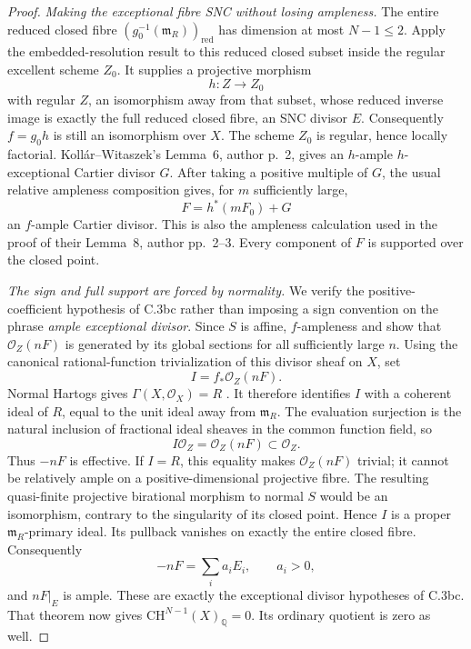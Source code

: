 \begin{proof}
\emph{Making the exceptional fibre SNC without losing ampleness.}
The entire reduced closed fibre
\((g_0^{-1}(\mathfrak m_R))_{\mathrm{red}}\) has dimension at most
\(N-1\leq2\). Apply the embedded-resolution result
\citet[Corollary 0.4 and its proof, author p.~5]
{frC3bdCossartJannsenSaito2013} to this reduced closed subset
inside the regular excellent scheme \(Z_0\).
It supplies a projective morphism
\[
                              h:Z\longrightarrow Z_0
\]
with regular \(Z\), an isomorphism away from that subset, whose
reduced inverse image is exactly the full reduced closed fibre,
an SNC divisor \(E\).
Consequently \(f=g_0h\) is still an isomorphism over \(X\).
The scheme \(Z_0\) is regular, hence locally factorial.
Koll\'ar--Witaszek's Lemma~6, author p.~2, gives an
\(h\)-ample \(h\)-exceptional Cartier divisor \(G\).
After taking a positive multiple of \(G\), the usual relative
ampleness composition gives, for \(m\) sufficiently large,
\[
                          F=h^*(mF_0)+G
\]
an \(f\)-ample Cartier divisor. This is also the ampleness
calculation used in the proof of their Lemma~8, author pp.~2--3.
Every component of \(F\) is supported over the closed point.

\emph{The sign and full support are forced by normality.}
We verify the positive-coefficient hypothesis of C.3bc rather
than imposing a sign convention on the phrase
\emph{ample exceptional divisor}.
Since \(S\) is affine, \(f\)-ampleness and
\citet[Proposition 28.27.13(7), Tag 01Q3]
{frC3bdStacksGeneration} show that
\(\mathcal O_Z(nF)\) is generated by its global sections for
all sufficiently large \(n\).
Using the canonical rational-function trivialization of this
divisor sheaf on \(X\), set
\[
                         I=f_*\mathcal O_Z(nF).
\]
Normal Hartogs gives
\(\Gamma(X,\mathcal O_X)=R\)
\citep[Remark 31.17.2, Tag 0BCS]{frC3bdStacksHartogs}.
It therefore identifies \(I\) with a coherent ideal of \(R\),
equal to the unit ideal away from \(\mathfrak m_R\).
The evaluation surjection is the natural inclusion of fractional
ideal sheaves in the common function field, so
\[
                      I\mathcal O_Z=\mathcal O_Z(nF)
                                     \subset\mathcal O_Z.
\]
Thus \(-nF\) is effective. If \(I=R\), this equality makes
\(\mathcal O_Z(nF)\) trivial; it cannot be relatively ample on
a positive-dimensional projective fibre. The resulting
quasi-finite projective birational morphism to normal \(S\)
would be an isomorphism, contrary to the singularity of its
closed point. Hence \(I\) is a proper
\(\mathfrak m_R\)-primary ideal. Its pullback vanishes on
exactly the entire closed fibre. Consequently
\[
                    -nF=\sum_i a_iE_i,\qquad a_i>0,
\]
and \(nF|_E\) is ample. These are exactly the exceptional
divisor hypotheses of C.3bc. That theorem now gives
\(\mathrm{CH}^{N-1}(X)_{\mathbb Q}=0\).
Its ordinary quotient is zero as well.
\end{proof}
